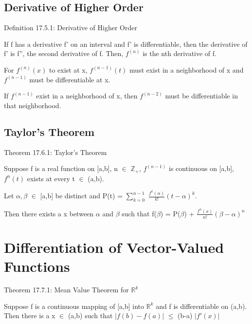 \subsection{ Derivative of Higher Order }

{ \color{blue} Definition 17.5.1: Derivative of Higher Order }

    \begin{adjustbox}{minipage=14cm, right, vspace=0.1cm 0cm}
        If f has a derivative f' on an interval and f' is differentiable,
        then the derivative of f' is f'', the second derivative of f.
        Then, $f^{(n)}$ is the nth derivative of f.

        For $f^{(n)}(x)$ to exist at x, $f^{(n-1)}(t)$ must exist
        in a neighborhood of x and $f^{(n-1)}$ must be differentiable at x.
        
        If $f^{(n-1)}$ exist in a neighborhood of x, then $f^{(n-2)}$
        must be differentiable in that neighborhood.
    \end{adjustbox}





\subsection{ Taylor's Theorem }

{ \color{red} Theorem 17.6.1: Taylor's Theorem }

    \begin{adjustbox}{minipage=14cm, right, vspace=0.1cm 0cm}
        Suppose f is a real function on [a,b], n $\in$ $\mathbb{Z}_+$,
        $f^{(n-1)}$ is continuous on [a,b], $f^n(t)$ exists at every t $\in$ (a,b).
        
        Let $\alpha,\beta$ $\in$ [a,b] be distinct and
        P(t) = $\sum_{k=0}^{n-1}$ $\frac{f^k(\alpha)}{k!} (t-\alpha)^k$.

        Then there exists a x between $\alpha$ and $\beta$ such that
        f($\beta$) = P($\beta$) + $\frac{f^n(x)}{n!} (\beta-\alpha)^n$
    \end{adjustbox}





\section{ Differentiation of Vector-Valued Functions }

{ \color{red} Theorem 17.7.1: Mean Value Theorem for $\mathbb{R}^k$ }

    \begin{adjustbox}{minipage=14cm, right, vspace=0.1cm 0cm}
        Suppose f is a continuous mapping of [a,b] into $\mathbb{R}^k$
        and f is differentiable on (a,b). Then there is a x $\in$ (a,b)
        such that $|f(b) - f(a)|$ $\leq$ (b-a) $|f'(x)|$
    \end{adjustbox}
